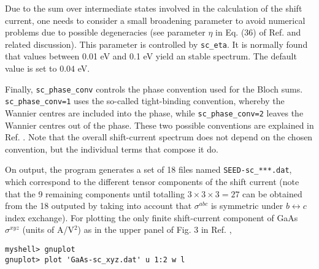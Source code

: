 \documentclass[a4paper,11pt,twoside]{article}
\begin{document}
Due to the sum over intermediate states involved in the calculation of the shift current, 
one needs to consider a small broadening parameter to avoid numerical problems due to possible degeneracies
(see parameter $\eta$ in Eq. (36) of Ref. \cite{ibanez-azpiroz_ab_2018} and related discussion).
This parameter is controlled by \verb|sc_eta|. It is normally found that values between 0.01 eV and 0.1 eV 
yield an stable spectrum. The default value is set to  $0.04$ eV.

Finally, \verb|sc_phase_conv| controls the phase convention used for the Bloch sums. 
\verb|sc_phase_conv=1| uses the so-called tight-binding convention, whereby the Wannier centres are included
into the phase, while   \verb|sc_phase_conv=2| leaves the Wannier centres out of the phase.
These two possible conventions are explained in Ref. \cite{pythtb}. 
Note that the overall shift-current spectrum does not depend on the chosen convention,
but the individual terms that compose it do.


On output, the program generates a set of 18 files named \verb|SEED-sc_***.dat|, 
which correspond to the different tensor components  of the shift current
(note that the 9 remaining components until totalling $3\times3\times3=27$ 
can be obtained from the 18 outputed by taking into account that $\sigma^{abc}$ is 
symmetric under $b\leftrightarrow c$ index exchange).
For plotting the only finite shift-current component of GaAs $\sigma^{xyz}$ (units of A/V$^{2}$) as in the upper 
panel of Fig. 3 in Ref. \cite{ibanez-azpiroz_ab_2018},
\begin{verbatim}
myshell> gnuplot
gnuplot> plot 'GaAs-sc_xyz.dat' u 1:2 w l
\end{verbatim} 

\end{document}

